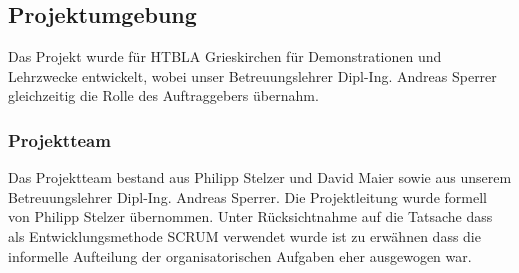 \subsection{Projektumgebung}
Das Projekt wurde für HTBLA Grieskirchen für Demonstrationen und Lehrzwecke entwickelt, wobei unser Betreuungslehrer Dipl-Ing. Andreas Sperrer gleichzeitig die Rolle des Auftraggebers übernahm. 

\subsubsection{Projektteam}
Das Projektteam bestand aus Philipp Stelzer und David Maier sowie aus unserem Betreuungslehrer Dipl-Ing. Andreas Sperrer. Die Projektleitung wurde formell von Philipp Stelzer übernommen. Unter Rücksichtnahme auf die Tatsache dass als Entwicklungsmethode SCRUM verwendet wurde ist zu erwähnen dass die informelle Aufteilung der organisatorischen Aufgaben eher ausgewogen war.

